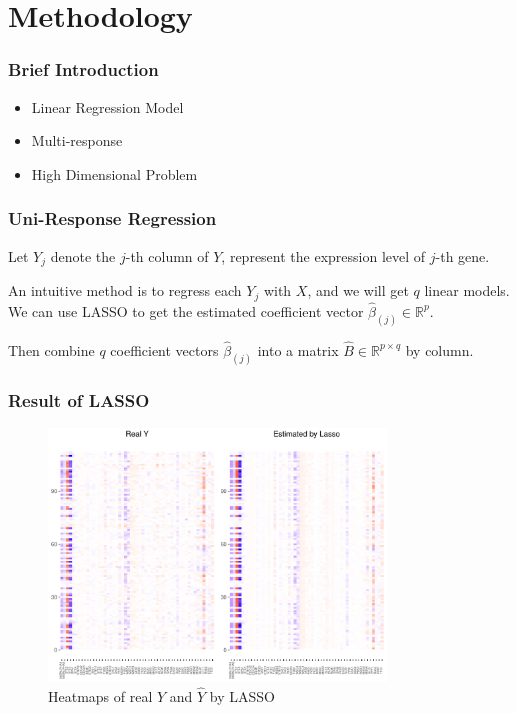 \section{Methodology}
\begin{frame}
    \sectionpage
\end{frame}

\begin{frame}
    \frametitle{Brief Introduction}

    \begin{itemize}
        \item Linear Regression Model
        \item Multi-response
        \item High Dimensional Problem
    \end{itemize}

\end{frame}

\begin{frame}
    \frametitle{Uni-Response Regression}

    Let $Y_j$ denote the $j$-th column of $Y$, represent the expression level of $j$-th gene. 

    An intuitive method is to regress each $Y_j$ with $X$, and we will get $q$ linear models. 
    We can use LASSO to get the estimated coefficient vector $\hat{\beta}_{(j)}\in\mathbb{R}^{p}$. 
    
    Then combine $q$ coefficient vectors $\hat{\beta}_{(j)}$ into a matrix $\widehat{B}\in\mathbb{R}^{p\times q}$ by column. 
\end{frame}

\begin{frame}
    \frametitle{Result of LASSO}

    \begin{figure}[h]
        \centering
        \includegraphics[width=0.8\textwidth]{./figs/heatmap_lasso.pdf}
        \caption{Heatmaps of real $Y$ and $\hat{Y}$ by LASSO}
    \end{figure}
\end{frame}

